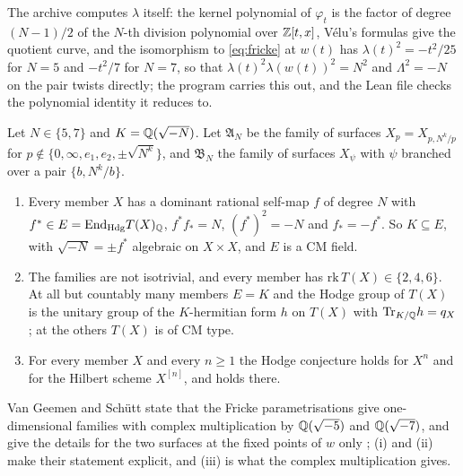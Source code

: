 The archive \cite{BB26code} computes $\lambda$ itself: the kernel polynomial of $\varphi_{t}$ is the factor of degree $(N-1)/2$ of the $N$-th division polynomial over $\mathbb{Z}[t,x]$, V\'elu's formulas give the quotient curve, and the isomorphism to \eqref{eq:fricke} at $w(t)$ has $\lambda(t)^{2}=-t^{2}/25$ for $N=5$ and $-t^{2}/7$ for $N=7$, so that $\lambda(t)^{2}\lambda(w(t))^{2}=N^{2}$ and $\Lambda^{2}=-N$ on the pair twists directly; the program  carries this out, and the Lean file checks the polynomial identity it reduces to.

\begin{theorem}\label{thm:fricke}
Let $N\in\{5,7\}$ and $K=\mathbb{Q}(\sqrt{-N})$. Let $\mathfrak{A}_{N}$ be the family of surfaces $X_{p}=X_{p,N^{k}/p}$ for $p\notin\{0,\infty,e_{1},e_{2},\pm\sqrt{N^{k}}\}$, and $\mathfrak{B}_{N}$ the family of surfaces $X_{\psi}$ with $\psi$ branched over a pair $\{b,N^{k}/b\}$.
\begin{enumerate}[label=\textup{(\roman*)},leftmargin=2.4em,itemsep=2pt]
\item Every member $X$ has a dominant rational self-map $f$ of degree $N$ with $f^{*}\in E=\mathrm{End}_{\mathrm{Hdg}}T(X)_{\mathbb{Q}}$, $f^{*}f_{*}=N$, $(f^{*})^{2}=-N$ and $f_{*}=-f^{*}$. So $K\subseteq E$, with $\sqrt{-N}=\pm f^{*}$ algebraic on $X\times X$, and $E$ is a CM field.
\item The families are not isotrivial, and every member has $\mathrm{rk}\,T(X)\in\{2,4,6\}$. At all but countably many members $E=K$ and the Hodge group of $T(X)$ is the unitary group of the $K$-hermitian form $h$ on $T(X)$ with $\mathrm{Tr}_{K/\mathbb{Q}}h=q_{X}$; at the others $T(X)$ is of CM type.
\item For every member $X$ and every $n\ge1$ the Hodge conjecture holds for $X^{n}$ and for the Hilbert scheme $X^{[n]}$, and \Fiii{} holds there.
\end{enumerate}
\end{theorem}

Van Geemen and Sch\"utt state that the Fricke parametrisations give one-dimensional families with complex multiplication by $\mathbb{Q}(\sqrt{-5})$ and $\mathbb{Q}(\sqrt{-7})$, and give the details for the two surfaces at the fixed points of $w$ only \cite[\S7.6]{vGS25}; (i) and (ii) make their statement explicit, and (iii) is what the complex multiplication gives.

